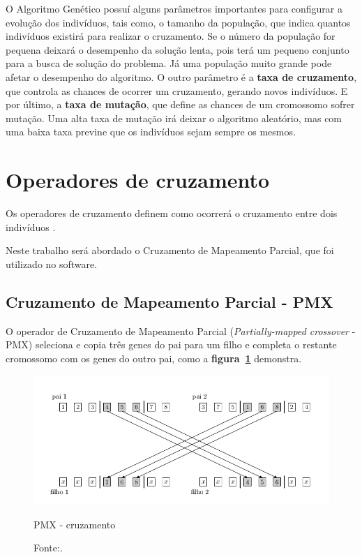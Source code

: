 \documentclass{abnt}
\begin{document}
		O Algoritmo Genético possuí alguns parâmetros importantes para configurar a evolução dos indivíduos, tais como, o tamanho da população, que indica quantos indivíduos existirá para realizar o cruzamento. Se o número da população for pequena deixará o desempenho da solução lenta, pois terá um pequeno conjunto para a busca de solução do problema. Já uma população muito grande pode afetar o desempenho do algoritmo. O outro parâmetro é a \textbf{taxa de cruzamento}, que controla as chances de ocorrer um cruzamento, gerando novos indivíduos. E por último, a \textbf{taxa de mutação}, que define as chances de um cromossomo sofrer mutação. Uma alta taxa de mutação irá deixar o algoritmo aleatório, mas com uma baixa taxa previne que os indivíduos sejam sempre os mesmos.

		\section{Operadores de cruzamento}

			Os operadores de cruzamento definem como ocorrerá o cruzamento entre dois indivíduos \cite{0012-pdf}.

			Neste trabalho será abordado o Cruzamento de Mapeamento Parcial, que foi utilizado no software.

		\subsection{Cruzamento de Mapeamento Parcial - PMX} 
			\label{Spmx}
			O operador de Cruzamento de Mapeamento Parcial (\textit{Partially-mapped crossover} - PMX)  seleciona e copia três genes do pai para um filho e completa o restante cromossomo com os genes do outro pai, como a \textbf{figura~\ref{pmx}} demonstra.

			\begin{figure}[h]
				\centering
		        \includegraphics[width = 14cm,keepaspectratio]{img/pmx.png}
		        \caption{PMX - cruzamento}
		        \caption*{Fonte:\cite{0012-pdf}.}
		        \label{pmx}
	   		\end{figure}
\end{document}
